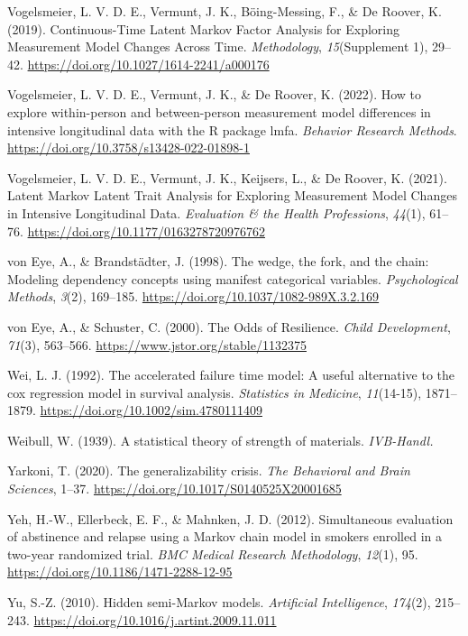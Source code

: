 \documentclass[12pt]{./styles/outhesis}
\begin{document}
\leavevmode{}%
Vogelsmeier, L. V. D. E., Vermunt, J. K., Böing-Messing, F., \& De
Roover, K. (2019). Continuous-{Time Latent Markov Factor Analysis} for
{Exploring} {Measurement Model Changes Across Time}. \emph{Methodology},
\emph{15}(Supplement 1), 29--42.
\url{https://doi.org/10.1027/1614-2241/a000176}

\leavevmode{}%
Vogelsmeier, L. V. D. E., Vermunt, J. K., \& De Roover, K. (2022). How
to explore within-person and between-person measurement model
differences in intensive longitudinal data with the {R} package lmfa.
\emph{Behavior Research Methods}.
\url{https://doi.org/10.3758/s13428-022-01898-1}

\leavevmode{}%
Vogelsmeier, L. V. D. E., Vermunt, J. K., Keijsers, L., \& De Roover, K.
(2021). Latent {Markov Latent Trait Analysis} for {Exploring Measurement
Model Changes} in {Intensive Longitudinal Data}. \emph{Evaluation \& the
Health Professions}, \emph{44}(1), 61--76.
\url{https://doi.org/10.1177/0163278720976762}

\leavevmode{}%
von Eye, A., \& Brandstädter, J. (1998). The wedge, the fork, and the
chain: {Modeling} dependency concepts using manifest categorical
variables. \emph{Psychological Methods}, \emph{3}(2), 169--185.
\url{https://doi.org/10.1037/1082-989X.3.2.169}

\leavevmode{}%
von Eye, A., \& Schuster, C. (2000). The {Odds} of {Resilience}.
\emph{Child Development}, \emph{71}(3), 563--566.
\url{https://www.jstor.org/stable/1132375}

\leavevmode{}%
Wei, L. J. (1992). The accelerated failure time model: {A} useful
alternative to the cox regression model in survival analysis.
\emph{Statistics in Medicine}, \emph{11}(14-15), 1871--1879.
\url{https://doi.org/10.1002/sim.4780111409}

\leavevmode{}%
Weibull, W. (1939). A statistical theory of strength of materials.
\emph{IVB-Handl.}

\leavevmode{}%
Yarkoni, T. (2020). The generalizability crisis. \emph{The Behavioral
and Brain Sciences}, 1--37.
\url{https://doi.org/10.1017/S0140525X20001685}

\leavevmode{}%
Yeh, H.-W., Ellerbeck, E. F., \& Mahnken, J. D. (2012). Simultaneous
evaluation of abstinence and relapse using a {Markov} chain model in
smokers enrolled in a two-year randomized trial. \emph{BMC Medical
Research Methodology}, \emph{12}(1), 95.
\url{https://doi.org/10.1186/1471-2288-12-95}

\leavevmode{}%
Yu, S.-Z. (2010). Hidden semi-{Markov} models. \emph{Artificial
Intelligence}, \emph{174}(2), 215--243.
\url{https://doi.org/10.1016/j.artint.2009.11.011}
\end{document}
